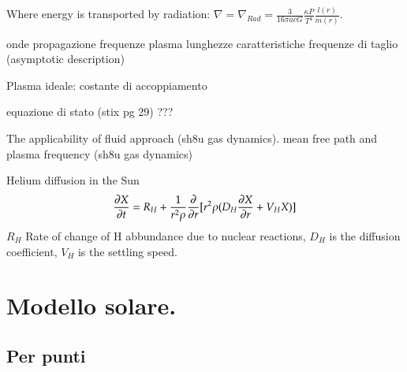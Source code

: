 \documentclass[../main.tex]{subfiles}
\begin{document}
\begin{itemize*}
\item Where energy is transported by radiation: $\nabla=\nabla_{Rad}=\frac{3}{16\pi acG}\frac{\kappa P}{T^4}\frac{l(r)}{m(r)}$.
\item onde propagazione frequenze plasma lunghezze caratteristiche frequenze di taglio (asymptotic description)
\item Plasma ideale: costante di accoppiamento
\item equazione di stato (stix pg 29) ???
\item The applicability of fluid approach (sh8u gas dynamics). mean free path and plasma frequency (sh8u gas dynamics)
\item Helium diffusion in the Sun
\begin{equation*}
    \PDy{t}{X}=R_H+\frac{1}{r^2\rho}\PDof{r}[r^2\rho(D_H\PDy{r}{X}+V_HX)]
\end{equation*}
$R_H$ Rate of change of H abbundance due to nuclear reactions, $D_H$ is the diffusion coefficient, $V_H$ is the settling speed.

\end{itemize*}





\section{Modello solare.}

\subsection{Per punti}
\end{document}
